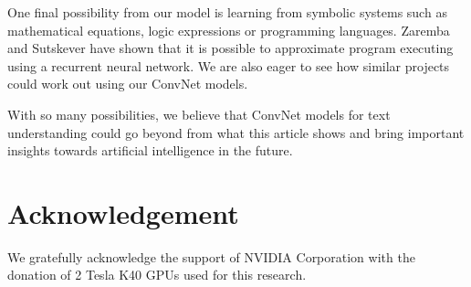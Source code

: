 \documentclass{article}
\begin{document}
\begin{CJK}{UTF8}{gbsn}
One final possibility from our model is learning from symbolic systems such as mathematical equations, logic expressions or programming languages. Zaremba and Sutskever\cite{ZS14} have shown that it is possible to approximate program executing using a recurrent neural network. We are also eager to see how similar projects could work out using our ConvNet models.

With so many possibilities, we believe that ConvNet models for text understanding could go beyond from what this article shows and bring important insights towards artificial intelligence in the future.

\section*{Acknowledgement}

We gratefully acknowledge the support of NVIDIA Corporation with the donation of 2 Tesla K40 GPUs used for this research.




\end{CJK}
\end{document}
